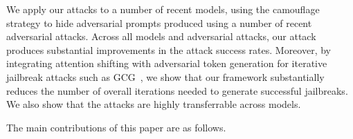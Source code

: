 
We apply our attacks to a number of recent models, using the camouflage strategy to hide adversarial prompts produced using a number of recent adversarial attacks.  Across all models and adversarial attacks, our attack produces substantial improvements in the attack success rates.  Moreover, by integrating attention shifting with adversarial token generation for iterative jailbreak attacks such as GCG~\cite{zou2023universal}, we show that our framework substantially reduces the number of overall iterations needed to generate successful jailbreaks.  We also show that the attacks are highly transferrable across models.

\noindent The main contributions of this paper are as follows.

